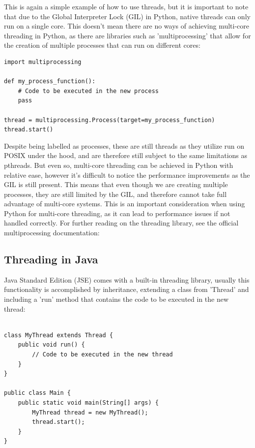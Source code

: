 \documentclass[12pt,a4paper]{article}
\begin{document}
This is again a simple example of how to use threads, but it is important to note that due to the Global Interpreter Lock (GIL) in Python, native threads can only run on a single core\parencite{PythonGIL}. This doesn't mean there are no ways of achieving multi-core threading in Python, as there are libraries such as 'multiprocessing' that allow for the creation of multiple processes that can run on different cores:

\begin{verbatim}
import multiprocessing

def my_process_function():
    # Code to be executed in the new process
    pass

thread = multiprocessing.Process(target=my_process_function)
thread.start()
\end{verbatim}

Despite being labelled as processes, these are still threads as they utilize run on POSIX under the hood\parencite{PythonMultiprocessing}, and are therefore still subject to the same limitations as pthreads. But even so, multi-core threading can be achieved in Python with relative ease, however it's difficult to notice the performance improvements as the GIL is still present\parencite{PythonGIL}. This means that even though we are creating multiple processes, they are still limited by the GIL, and therefore cannot take full advantage of multi-core systems. This is an important consideration when using Python for multi-core threading, as it can lead to performance issues if not handled correctly. For further reading on the threading library, see the official multiprocessing documentation: 

\subsection{Threading in Java}

Java Standard Edition (JSE) comes with a built-in threading library\parencite{JavaThreadClass}, usually this functionality is accomplished by inheritance, extending a class from 'Thread' and including a 'run' method that contains the code to be executed in the new thread:

\begin{verbatim}

class MyThread extends Thread {
    public void run() {
        // Code to be executed in the new thread
    }
}

public class Main {
    public static void main(String[] args) {
        MyThread thread = new MyThread();
        thread.start();
    }
}
\end{verbatim}
\end{document}
